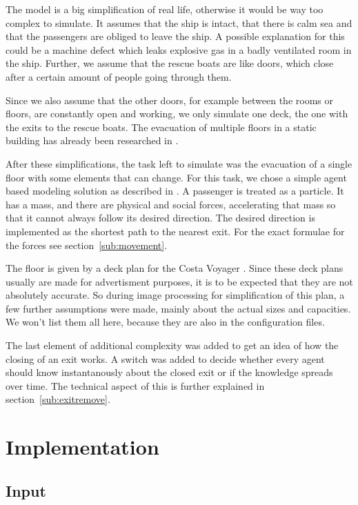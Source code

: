 \documentclass[11pt]{article}
\begin{document}
The model is a big simplification of real life, otherwise it would be way too
complex to simulate.  It assumes that the ship is intact, that there is calm
sea and that the passengers are obliged to leave the ship.  A possible
explanation for this could be a machine defect which leaks explosive gas in a
badly ventilated room in the ship.  Further, we assume that the rescue boats are
like doors, which close after a certain amount of people going through them. 

Since we also assume that the other doors, for example between the rooms or
floors, are constantly open and working, we only simulate one deck, the one
with the exits to the rescue boats.  The evacuation of multiple floors in a
static building has already been researched in \cite{multilevel}. 

After these simplifications, the task left to simulate was the evacuation of a
single floor with some elements that can change.  For this task, we chose a
simple agent based modeling solution as described in \cite{helbing}.  A
passenger is treated as a particle.  It has a mass, and there are physical and
social forces, accelerating that mass so that it cannot always follow its
desired direction.  The desired direction is implemented as the shortest path
to the nearest exit.  For the exact formulae for the forces see
section~\ref{sub:movement}.

The floor is given by a deck plan for the Costa Voyager \cite{costa}. Since
these deck plans usually are made for advertisment purposes, it is to be
expected that they are not absolutely accurate.  So during image processing for
simplification of this plan, a few further assumptions were made, mainly about
the actual sizes and capacities.  We won't list them all here, because they are
also in the configuration files. 

The last element of additional complexity was added to get an idea of how the
closing of an exit works.  A switch was added to decide whether every agent
should know instantanously about the closed exit or if the knowledge spreads
over time.  The technical aspect of this is further explained in
section~\ref{sub:exitremove}.

\section{Implementation}

\subsection{Input}
\end{document}

